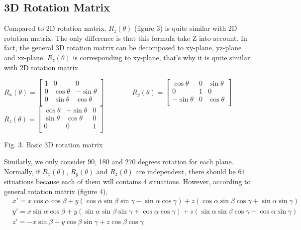 \subsection{3D Rotation Matrix}
Compared to 2D rotation matrix, $R_{z}(\theta)$ (figure 3) is quite similar with 2D rotation matrix. The only difference is that this formula take Z into account. In fact, the general 3D rotation matrix can be decomposed to xy-plane, yz-plane and xz-plane. $R_{z}(\theta)$ is corresponding to xy-plane, that's why it is quite similar with 2D rotation matrix. \\
\begin{center}
$
R_{x}(\theta)=\begin{bmatrix}
1&          0&          0\\
0&\cos\theta & -\sin\theta\\
0&\sin\theta & \cos\theta\\
\end{bmatrix}
$
$\hspace{40pt}$
$
R_{y}(\theta)=\begin{bmatrix}
  \cos\theta&          0&\sin\theta\\
           0&          1& 0\\
-\sin\theta &          0&\cos\theta\\
\end{bmatrix}
$
$
R_{z}(\theta)=\begin{bmatrix}
\cos\theta&-\sin\theta&0\\
\sin\theta& \cos\theta&0\\
         0&          0&1\\
\end{bmatrix}
$\\
\end{center}
\begin{center}
Fig. 3. Basic 3D rotation matrix
\end{center}
Similarly, we only consider 90, 180 and 270 degrees rotation for each plane. Normally, if $R_{x}(\theta)$, $R_{y}(\theta)$ and $R_{z}(\theta)$ are independent, there should be 64 situations because each of them will contains 4 situations. However, according to general rotation matrix (figure 4),
\begin{align*}
&x'=x\cos\alpha\cos\beta+y(\cos\alpha\sin\beta\sin\gamma-\sin\alpha\cos\gamma)+z(\cos\alpha\sin\beta\cos\gamma+\sin\alpha\sin\gamma)\\
&y'=x\sin\alpha\cos\beta+y(\sin\alpha\sin\beta\sin\gamma+\cos\alpha\cos\gamma)+z(\sin\alpha\sin\beta\cos\gamma-\cos\alpha\sin\gamma)\\
&z'=-x\sin\beta+y\cos\beta\sin\gamma+z\cos\beta\cos\gamma
\end{align*}
